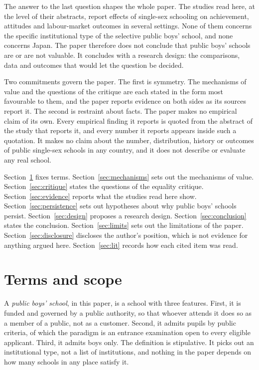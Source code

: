 \documentclass[11pt]{article}
\newcounter{mech}
\begin{document}
The answer to the last question shapes the whole paper. The studies read here, at the level of their abstracts, report effects of single-sex schooling on achievement, attitudes and labour-market outcomes in several settings. None of them concerns the specific institutional type of the selective public boys' school, and none concerns Japan. The paper therefore does not conclude that public boys' schools are or are not valuable. It concludes with a research design: the comparisons, data and outcomes that would let the question be decided.

Two commitments govern the paper. The first is symmetry. The mechanisms of value and the questions of the critique are each stated in the form most favourable to them, and the paper reports evidence on both sides as its sources report it. The second is restraint about facts. The paper makes no empirical claim of its own. Every empirical finding it reports is quoted from the abstract of the study that reports it, and every number it reports appears inside such a quotation. It makes no claim about the number, distribution, history or outcomes of public single-sex schools in any country, and it does not describe or evaluate any real school.

Section~\ref{sec:terms} fixes terms. Section~\ref{sec:mechanisms} sets out the mechanisms of value. Section~\ref{sec:critique} states the questions of the equality critique. Section~\ref{sec:evidence} reports what the studies read here show. Section~\ref{sec:persistence} sets out hypotheses about why public boys' schools persist. Section~\ref{sec:design} proposes a research design. Section~\ref{sec:conclusion} states the conclusion. Section~\ref{sec:limits} sets out the limitations of the paper. Section~\ref{sec:disclosure} discloses the author's position, which is not evidence for anything argued here. Section~\ref{sec:lit} records how each cited item was read.

\section{Terms and scope}\label{sec:terms}

A \emph{public boys' school}, in this paper, is a school with three features. First, it is funded and governed by a public authority, so that whoever attends it does so as a member of a public, not as a customer. Second, it admits pupils by public criteria, of which the paradigm is an entrance examination open to every eligible applicant. Third, it admits boys only. The definition is stipulative. It picks out an institutional type, not a list of institutions, and nothing in the paper depends on how many schools in any place satisfy it.
\end{document}
